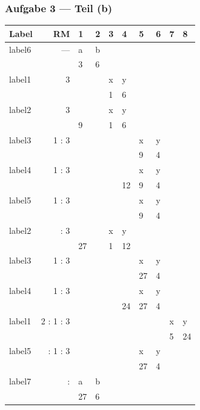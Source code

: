 \documentclass{beamer}
\newcommand{\col}[1]{\textcolor{cdpurple}{#1}}
\begin{document}
\begin{frame} \frametitle{Aufgabe 3 --- Teil (b)}
	\tiny \centering
	\def\arraystretch{0.9}
	\begin{tabular}{|p{1cm}|r||R{0.25cm}|R{0.25cm}|R{0.25cm}|R{0.25cm}|R{0.25cm}|R{0.25cm}|R{0.25cm}|R{0.25cm}|}
		\hline
		Label & RM & 1 & 2 & 3 & 4 & 5 & 6 & 7 & 8 \\ 
		\hline \hline
		label6 & ---   & a & b &       &  &&&&\\ 
		&       & 3     & 6     &       & &&&& \\ \hline
		label1 & 3 &       &       & x & y &&&&\\ 
		&       &       &       & \col{1}     & 6 &&&&\\ \hline
		label2 & 3 &       &       & x & y &&&&\\ 
		&       & 9     &       & \col{1}     & 6&&&& \\ \hline
		label3 & 1 : 3 &       &       &       & & x & y && \\ 
		&       &       &       &       & & 9 & \col{4} && \\ \hline
		label4 & 1 : 3 &       &       &       &  & x & y &&\\ 
		&       &       &       &       & 12 & 9 & \col{4} &&\\ \hline
		label5 & 1 : 3 &       &       &       &  & x & y &&\\ 
		&       &       &       &       &  & 9 & \col{4} &&\\ \hline
		label2 &  : 3 &       &       & x & y &&&&\\ 
		&       & 27    &       & \col{1}     & 12 &&&&\\ \hline
		label3 & 1 : 3 &       &       &       & & x & y  && \\ 
		&       &       &       &       &  & 27 & \col{4} && \\ \hline
		label4 & 1 : 3 &       &       &       & &  x & y &&\\ 
		&&&&& 24 & 27 & \col{4} &&\\ \hline
		label1 & 2 : 1 : 3 &       &       &       &       &       &       & x & y \\ 
		&       &       &       &       &       &       &       & \col{5}     & 24 \\ \hline
		label5 &  : 1 : 3 &       &       &       &       & x & y &       &  \\ 
		&       &       &       &       &       & 27    & \col{4}     &       &  \\ \hline
		label7 &  :  & a & b &       &       &       &       &       &  \\ 
		&       & 27    & 6     &       &       &       &       &       &  \\ \hline
	\end{tabular}
\end{frame}



\end{document}
